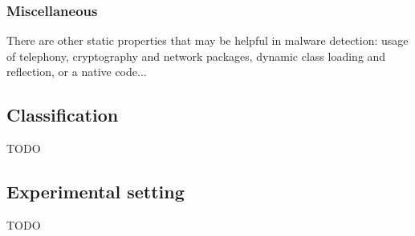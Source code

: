 \subsubsection{Miscellaneous}
There are other static properties that may be helpful in malware detection: usage of telephony, cryptography and network packages, dynamic class loading and reflection, or a native code...

\subsection{Classification}
TODO

\subsection{Experimental setting}
TODO